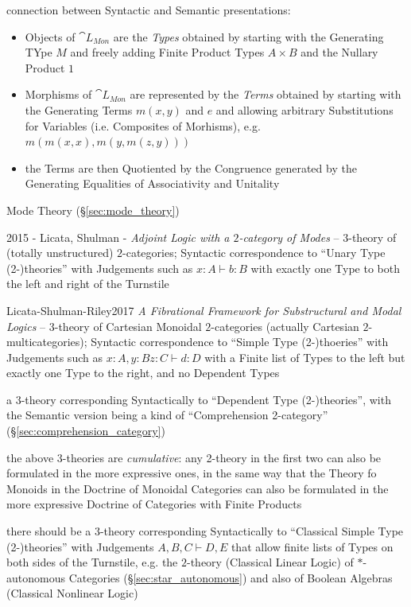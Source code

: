connection between Syntactic and Semantic presentations:

\begin{itemize}
  \item Objects of $\cat{L}_{Mon}$ are the \emph{Types} obtained by starting
    with the Generating TYpe $M$ and freely adding Finite Product Types $A
    \times B$ and the Nullary Product $1$
  \item Morphisms of $\cat{L}_{Mon}$ are represented by the \emph{Terms}
    obtained by starting with the Generating Terms $m(x,y)$ and $e$ and
    allowing arbitrary Substitutions for Variables (i.e. Composites of
    Morhisms), e.g. $m(m(x,x), m(y,m(z,y)))$
  \item the Terms are then Quotiented by the Congruence generated by the
    Generating Equalities of Associativity and Unitality
\end{itemize}

\fist Mode Theory (\S\ref{sec:mode_theory})

2015 - Licata, Shulman - \emph{Adjoint Logic with a $2$-category of Modes} --
$3$-theory of (totally unstructured) $2$-categories; Syntactic correspondence
to ``Unary Type (2-)theories'' with Judgements such as $x : A \vdash b : B$
with exactly one Type to both the left and right of the Turnstile

Licata-Shulman-Riley2017 \emph{A Fibrational Framework for
  Substructural and Modal Logics}
-- $3$-theory of Cartesian Monoidal $2$-categories (actually Cartesian
$2$-multicategories); Syntactic correspondence to ``Simple Type (2-)thoeries''
with Judgements such as $x : A, y : B z : C \vdash d : D$ with a Finite list of
Types to the left but exactly one Type to the right, and no Dependent Types

a $3$-theory corresponding Syntactically to ``Dependent Type (2-)theories'',
with the Semantic version being a kind of ``Comprehension 2-category''
(\S\ref{sec:comprehension_category})

the above $3$-theories are \emph{cumulative}: any 2-theory in the first two can
also be formulated in the more expressive ones, in the same way that the Theory
fo Monoids in the Doctrine of Monoidal Categories can also be formulated in the
more expressive Doctrine of Categories with Finite Products

there should be a $3$-theory corresponding Syntactically to ``Classical Simple
Type (2-)theories'' with Judgements $A,B,C \vdash D,E$ that allow finite lists
of Types on both sides of the Turnstile, e.g. the $2$-theory (Classical Linear
Logic) of $*$-autonomous Categories (\S\ref{sec:star_autonomous}) and also of
Boolean Algebras (Classical Nonlinear Logic)

